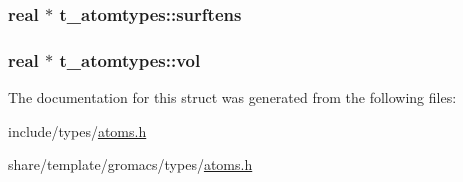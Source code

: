 \hypertarget{structt__atomtypes_ad1696e463ad4dd7addba574236864840}{
\subsubsection[{surftens}]{\setlength{\rightskip}{0pt plus 5cm}real $\ast$ {\bf t\-\_\-atomtypes\-::surftens}}}\label{structt__atomtypes_ad1696e463ad4dd7addba574236864840}
\hypertarget{structt__atomtypes_a047f746007c3cd9aea9fc273b5f8bdb1}{
\subsubsection[{vol}]{\setlength{\rightskip}{0pt plus 5cm}real $\ast$ {\bf t\-\_\-atomtypes\-::vol}}}\label{structt__atomtypes_a047f746007c3cd9aea9fc273b5f8bdb1}


\-The documentation for this struct was generated from the following files\-:\begin{DoxyCompactItemize}
\item 
include/types/\hyperlink{include_2types_2atoms_8h}{atoms.\-h}\item 
share/template/gromacs/types/\hyperlink{share_2template_2gromacs_2types_2atoms_8h}{atoms.\-h}\end{DoxyCompactItemize}
